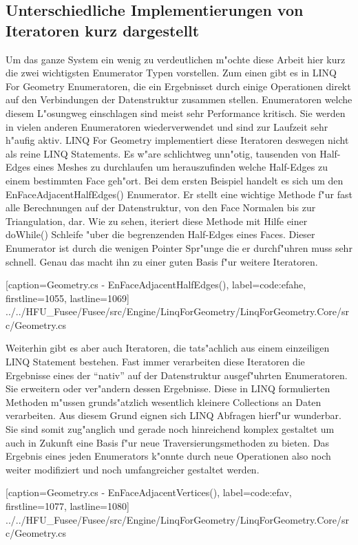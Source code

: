 \documentclass[pagesize, paper=a4, fontsize=12pt,titlepage=true, headings=small, headnosepline, abstractoff, liststotoc, nochapterprefix, plainheadsepline]{scrreprt}
\newcommand{\LFGS}{LINQ For Geometry }
\begin{document}
		\subsection {Unterschiedliche Implementierungen von Iteratoren kurz dargestellt}
			Um das ganze System ein wenig zu verdeutlichen m"ochte diese Arbeit hier kurz die zwei wichtigsten Enumerator Typen vorstellen. Zum einen gibt es in \LFGS Enumeratoren, die ein Ergebnisset durch einige Operationen direkt auf den Verbindungen der Datenstruktur zusammen stellen. Enumeratoren welche diesem L"osungweg einschlagen sind meist sehr Performance kritisch. Sie werden in vielen anderen Enumeratoren wiederverwendet und sind zur Laufzeit sehr h"aufig aktiv. \LFGS implementiert diese Iteratoren deswegen nicht als reine LINQ Statements. Es w"are schlichtweg unn"otig, tausenden von Half-Edges eines Meshes zu durchlaufen um herauszufinden welche Half-Edges zu einem bestimmten Face geh"ort. Bei dem ersten Beispiel handelt es sich um den EnFaceAdjacentHalfEdges() Enumerator. Er stellt eine wichtige Methode f"ur fast alle Berechnungen auf der Datenstruktur, von den Face Normalen bis zur Triangulation, dar. Wie zu sehen, iteriert diese Methode mit Hilfe einer do{}While() Schleife "uber die begrenzenden Half-Edges eines Faces. Dieser Enumerator ist durch die wenigen Pointer Spr"unge die er durchf"uhren muss sehr schnell. Genau das macht ihn zu einer guten Basis f"ur weitere Iteratoren.


			[caption={Geometry.cs - EnFaceAdjacentHalfEdges()}, label=code:efahe, firstline=1055, lastline=1069]
			{../../HFU_Fusee/Fusee/src/Engine/LinqForGeometry/LinqForGeometry.Core/src/Geometry.cs}

Weiterhin gibt es aber auch Iteratoren, die tats"achlich aus einem einzeiligen LINQ Statement bestehen. Fast immer verarbeiten diese Iteratoren die Ergebnisse eines der "`nativ"' auf der Datenstruktur ausgef"uhrten Enumeratoren. Sie erweitern oder ver"andern dessen Ergebnisse. Diese in LINQ formulierten Methoden m"ussen grunds"atzlich wesentlich kleinere Collections an Daten verarbeiten. Aus diesem Grund eignen sich LINQ Abfragen hierf"ur wunderbar. Sie sind somit zug"anglich und gerade noch hinreichend komplex gestaltet um auch in Zukunft eine Basis f"ur neue Traversierungsmethoden zu bieten.
Das Ergebnis eines jeden Enumerators k"onnte durch neue Operationen also noch weiter modifiziert und noch umfangreicher gestaltet werden.

			[caption={Geometry.cs - EnFaceAdjacentVertices()}, label=code:efav, firstline=1077, lastline=1080]
			{../../HFU_Fusee/Fusee/src/Engine/LinqForGeometry/LinqForGeometry.Core/src/Geometry.cs}
\end{document}
